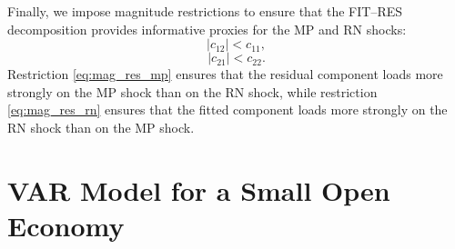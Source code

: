 \documentclass[12pt, reqno]{article}
\begin{document}
Finally, we impose magnitude restrictions to ensure that the FIT--RES decomposition provides informative proxies for the MP and RN shocks:
\begin{equation}
\label{eq:mag_res_mp}
|c_{12}| < c_{11},
\end{equation}
\begin{equation}
\label{eq:mag_res_rn}
|c_{21}| < c_{22}.
\end{equation}
Restriction \eqref{eq:mag_res_mp} ensures that the residual component loads more strongly on the MP shock than on the RN shock, while restriction \eqref{eq:mag_res_rn} ensures that the fitted component loads more strongly on the RN shock than on the MP shock. 



\section{VAR Model for a Small Open Economy}
\hypertarget{Section 2}{}
\end{document}
